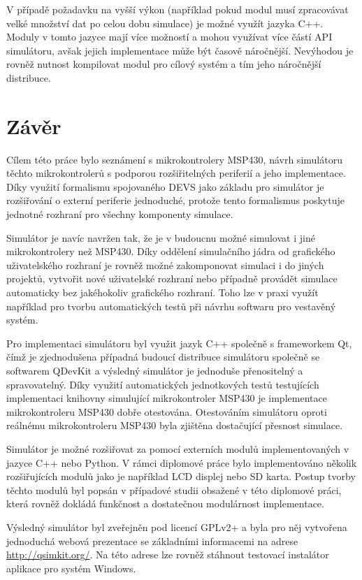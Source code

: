 V případě požadavku na vyšší výkon (například pokud modul musí zpracovávat velké množství dat po celou dobu simulace) je možné využít jazyka C++. Moduly v tomto jazyce mají více možností a mohou využívat více částí API simulátoru, avšak jejich implementace může být časově náročnější. Nevýhodou je rovněž nutnost kompilovat modul pro cílový systém a tím jeho náročnější distribuce.


\chapter{Závěr}

Cílem této práce bylo seznámení s mikrokontrolery MSP430, návrh simulátoru těchto mikrokontrolerů s podporou rozšiřitelných periferií a jeho implementace. Díky využití formalismu spojovaného DEVS jako základu pro simulátor je rozšiřování o externí periferie jednoduché, protože tento formalismus poskytuje jednotné rozhraní pro všechny komponenty simulace.

Simulátor je navíc navržen tak, že je v budoucnu možné simulovat i jiné mikrokontrolery než MSP430. Díky oddělení simulačního jádra od grafického uživatelského rozhraní je rovněž možné zakomponovat simulaci i do jiných projektů, vytvořit nové uživatelské rozhraní nebo případně provádět simulace automaticky bez jakéhokoliv grafického rozhraní. Toho lze v praxi využít například pro tvorbu automatických testů při návrhu softwaru pro vestavěný systém.

Pro implementaci simulátoru byl využit jazyk C++ společně s frameworkem Qt, čímž je zjednodušena případná budoucí distribuce simulátoru společně se softwarem QDevKit a výsledný simulátor je jednoduše přenositelný a spravovatelný. Díky využití automatických jednotkových testů testujících implementaci knihovny simulující mikrokontroler MSP430 je implementace mikrokontroleru MSP430 dobře otestována. Otestováním simulátoru oproti reálnému mikrokontroleru MSP430 byla zjištěna dostačující přesnost simulace.

Simulátor je možné rozšiřovat za pomocí externích modulů implementovaných v jazyce C++ nebo Python. V rámci diplomové práce bylo implementováno několik rozšiřujících modulů jako je například LCD displej nebo SD karta. Postup tvorby těchto modulů byl popsán v případové studii obsažené v této diplomové práci, která rovněž dokládá funkčnost a dostatečnou modulárnost implementace.

Výsledný simulátor byl zveřejněn pod licencí GPLv2+ a byla pro něj vytvořena jednoduchá webová prezentace se základními informacemi na adrese \url{http://qsimkit.org/}. Na této adrese lze rovněž stáhnout testovací instalátor aplikace pro systém Windows.

